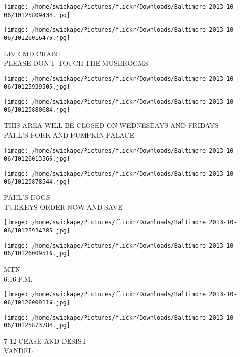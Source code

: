 \documentclass[10pt,letterpaper]{article}
\begin{document}
\texttt{[image: /home/swickape/Pictures/flickr/Downloads/Baltimore 2013-10-06/10125809434.jpg]}

\vspace{0.25in}
\texttt{[image: /home/swickape/Pictures/flickr/Downloads/Baltimore 2013-10-06/10126016476.jpg]}

LIVE MD CRABS\\
PLEASE DON'T TOUCH THE MUSHROOMS\\
\pagebreak

\texttt{[image: /home/swickape/Pictures/flickr/Downloads/Baltimore 2013-10-06/10125939505.jpg]}

\vspace{0.25in}
\texttt{[image: /home/swickape/Pictures/flickr/Downloads/Baltimore 2013-10-06/10125880684.jpg]}

THIS AREA WILL BE CLOSED ON WEDNESDAYS AND FRIDAYS\\
PAHL'S PORK AND PUMPKIN PALACE\\
\pagebreak

\texttt{[image: /home/swickape/Pictures/flickr/Downloads/Baltimore 2013-10-06/10126013566.jpg]}

\vspace{0.25in}
\texttt{[image: /home/swickape/Pictures/flickr/Downloads/Baltimore 2013-10-06/10125878544.jpg]}

PAHL'S HOGS\\
TURKEYS ORDER NOW AND SAVE\\
\pagebreak

\texttt{[image: /home/swickape/Pictures/flickr/Downloads/Baltimore 2013-10-06/10125934385.jpg]}

\vspace{0.25in}
\texttt{[image: /home/swickape/Pictures/flickr/Downloads/Baltimore 2013-10-06/10126009516.jpg]}

MTN\\
6:16 P.M.\\
\pagebreak

\texttt{[image: /home/swickape/Pictures/flickr/Downloads/Baltimore 2013-10-06/10126009116.jpg]}

\vspace{0.25in}
\texttt{[image: /home/swickape/Pictures/flickr/Downloads/Baltimore 2013-10-06/10125873784.jpg]}

7{-}12 CEASE AND DESIST\\
VANDEL\\
\pagebreak
\end{document}
